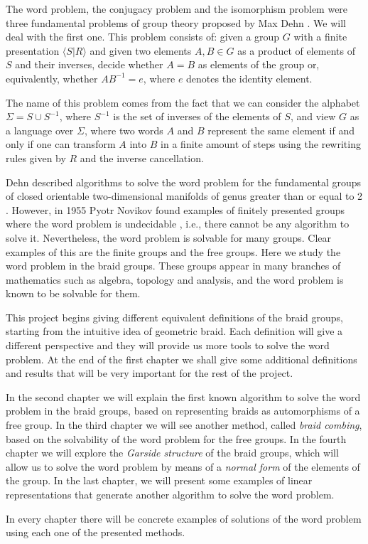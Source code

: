 \documentclass[TFG.tex]{subfiles}
\begin{document}

The word problem, the conjugacy problem and the isomorphism problem were three fundamental problems of group theory proposed by Max Dehn \cite{Dehn11}. We will deal with the first one. This problem consists of: given a group $G$ with a finite presentation $\langle S|R\rangle$ and given two elements $A,B\in G$ as a product of elements of $S$ and their inverses, decide whether $A=B$ as elements of the group or, equivalently, whether $AB^{-1}=e$, where $e$ denotes the identity element. 

The name of this problem comes from the fact that we can consider the alphabet $\Sigma=S\cup S^{-1}$, where $S^{-1}$ is the set of inverses of the elements of $S$, and view $G$ as a language over $\Sigma$, where two words $A$ and $B$ represent the same element if and only if one can transform $A$ into $B$ in a finite amount of steps using the rewriting rules given by $R$ and the inverse cancellation. 

Dehn described algorithms to solve the word problem for the fundamental groups of closed orientable two-dimensional manifolds of genus greater than or equal to 2 \cite{Dehn12}. However, in 1955 Pyotr Novikov found examples of finitely presented groups where the word problem is undecidable \cite{Novikov}, i.e., there cannot be any algorithm to solve it. Nevertheless, the word problem is solvable for many groups. Clear examples of this are the finite groups and the free groups. Here we study the word problem in the braid groups. These groups appear in many branches of mathematics such as algebra, topology and analysis, and the word problem is known to be solvable for them.  

This project begins giving different equivalent definitions of the braid groups, starting from the intuitive idea of geometric braid. Each definition will give a different perspective and they will provide us more tools to solve the word problem. At the end of the first chapter we shall give some additional definitions and results that will be very important for the rest of the project.

In the second chapter we will explain the first known algorithm to solve the word problem in the braid groups, based on representing braids as automorphisms of a free group. In the third chapter we will see another method, called \emph{braid combing}, based on the solvability of the word problem for the free groups. In the fourth chapter we will explore the \emph{Garside structure} of the braid groups, which will allow us to solve the word problem by means of a \emph{normal form} of the elements of the group. In the last chapter, we will present some examples of linear representations that generate another algorithm to solve the word problem. 

In every chapter there will be concrete examples of solutions of the word problem using each one of the presented methods.
\end{document}
